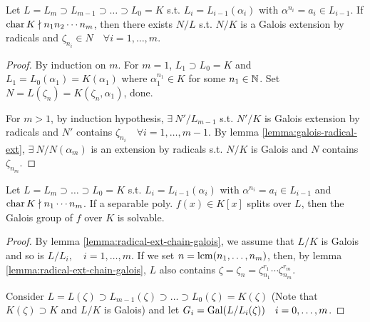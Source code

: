 \begin{lemma} \label{lemma:radical-ext-chain-galois}
  Let $L = L_m \supset L_{m-1} \supset \dots \supset L_0 = K$ s.t.
  $L_i = L_{i-1}(\alpha_i)$ with $\alpha^{n_i} = a_i \in L_{i-1}$.
  If $\operatorname{char} K \nmid n_1n_2\cdots n_m$, then there exists $N/L$ s.t.
  $N/K$ is a Galois extension by radicals and $\zeta_{n_i} \in N \quad
  \forall i = 1, \dots, m$.

  \begin{proof}
    By induction on $m$. For $m = 1$, $L_1 \supset L_0 = K$ and
    $L_1 = L_0(\alpha_1) = K(\alpha_1)$ where $\alpha_1^{n_1} \in K$ for some
    $n_1\in \mathbb{N}$. Set $N = L(\zeta_n) = K(\zeta_n, \alpha_1)$, done.

    For $m > 1$, by induction hypothesis, $\exists\: N'/L_{m-1}$ s.t.
    $N'/K$ is Galois extension by radicals and $N'$ contains
    $\zeta_{n_i} \quad \forall i = 1, \dots, m-1$.
    By lemma \ref{lemma:galois-radical-ext}, $\exists\: N/N(\alpha_m)$ is
    an extension by radicals s.t. $N/K$ is Galois and $N$ contains $\zeta_{n_m}$.
  \end{proof}
\end{lemma}

\begin{theorem}[Part A]
  Let $L = L_m \supset \dots \supset L_0 = K$ s.t. $L_i = L_{i-1}(\alpha_i)$
  with $\alpha^{n_i} = a_i \in L_{i-1}$ and $\operatorname{char} K \nmid n_1\cdots n_m$.
  If a separable poly. $f(x) \in K[x]$ splits over $L$, then the Galois group
  of $f$ over $K$ is solvable.
  
  \begin{proof}
    By lemma \ref{lemma:radical-ext-chain-galois}, we assume that $L/K$ is
    Galois and so is $L/L_i, \quad i=1,\dots,m$.
    If we set $n = \operatorname{lcm}(n_1, \dots, n_m)$, then, by lemma \ref{lemma:radical-ext-chain-galois},
    $L$ also contains $\zeta = \zeta_n = \zeta_{n_1}^{r_1} \cdots \zeta_{n_m}^{r_m}$.

    Consider $L = L(\zeta) \supset L_{m-1}(\zeta) \supset \dots \supset
    L_0(\zeta) = K(\zeta)$ (Note that $K(\zeta) \supset K$ and $L/K$ is Galois)
    and let $G_i = \operatorname{Gal}(L/L_i(\zeta)) \quad i = 0, \dots, m$.
  \end{proof}
\end{theorem}

